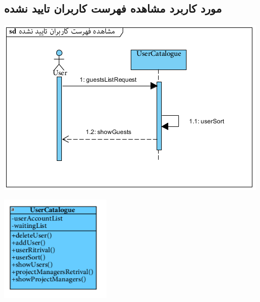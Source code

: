 \newpage
\vspace{2cm}
\subsection*{مورد کاربرد مشاهده فهرست کاربران تایید نشده}
\vspace{2cm}
\begin{center}
\includegraphics[width=\textwidth]{SequenceDiagrams/3.png}
\end{center}

\newpage
\vspace{2cm}
\begin{center}
\includegraphics[width=0.4\textwidth]{SequenceClasses/3.png}
\end{center}

\newpage
\vspace{2cm}
